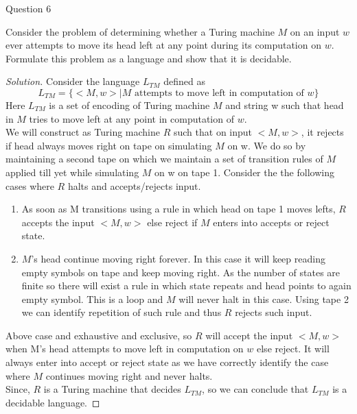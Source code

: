 \begin{solution}{Question 6}\label{ques:6}
    \begin{question}
        Consider the problem of determining whether a Turing machine $M$ on an input $w$ ever attempts to move its head left at any point during its computation on $w$. Formulate this problem as a language and show that it is decidable.
    \end{question}
    \tcblower{}
    \begin{proof}[Solution]
        Consider the language $L_{TM}$ defined as
        \[L_{TM} = \{<M, w> | M \text{ attempts to move left in computation of } w\}\]
        Here $L_{TM}$ is a set of encoding of Turing machine $M$ and string w such that head in $M$ tries to move left at any point in computation of $w$.
        \\    
        We will construct as Turing machine $R$ such that on input $<M, w>$, it rejects if head always moves right on tape on simulating $M$ on w. We do so by maintaining a second tape on which we maintain a set of transition rules of $M$ applied till yet while simulating $M$ on w on tape 1. Consider the the following cases where $R$ halts and accepts/rejects input.
        \begin{enumerate}
            \item As soon as M transitions using a rule in which head on tape 1 moves lefts, $R$ accepts the input $<M, w>$ else reject if $M$ enters into accepts or reject state.
            \item $M$'s head continue moving right forever. In this case it will keep reading empty symbols on tape and keep moving right. As the number of states are finite so there will exist a rule in which state repeats and head points to again empty symbol. This is a loop and $M$ will never halt in this case. Using tape 2 we can identify repetition of such rule and thus $R$ rejects such input.
        \end{enumerate}
        Above case and exhaustive and exclusive, so $R$ will accept the input $<M, w>$ when M's head attempts to move left in computation on $w$ else reject. It will always enter into accept or reject state as we have correctly identify the case where $M$ continues moving right and never halts.
        \\
        Since, $R$ is a Turing machine that decides $L_{TM}$, so we can conclude that $L_{TM}$ is a decidable language.
    \end{proof}
\end{solution}
